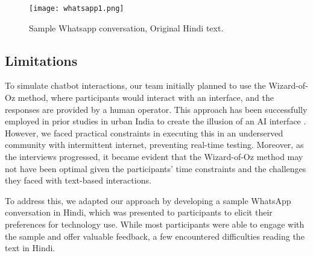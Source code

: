 \begin{figure}[htp]
\centerline{\texttt{[image: whatsapp1.png]}}
\caption{Sample Whatsapp conversation, Original Hindi text.}
\label{fig:whats1}
\end{figure}
\subsection{Limitations}
To simulate chatbot interactions, our team initially planned to use the Wizard-of-Oz method, where participants would interact with an interface, and the responses are provided by a human operator. This approach has been successfully employed in prior studies in urban India to create the illusion of an AI interface \cite{22}. However, we faced practical constraints in executing this in an underserved community with intermittent internet, preventing real-time testing. 
Moreover, as the interviews progressed, it became evident that the Wizard-of-Oz method may not have been optimal given the participants' time constraints and the challenges they faced with text-based interactions.

To address this, we adapted our approach by developing a sample WhatsApp conversation in Hindi, which was presented to participants to elicit their preferences for technology use. While most participants were able to engage with the sample and offer valuable feedback, a few encountered difficulties reading the text in Hindi.



